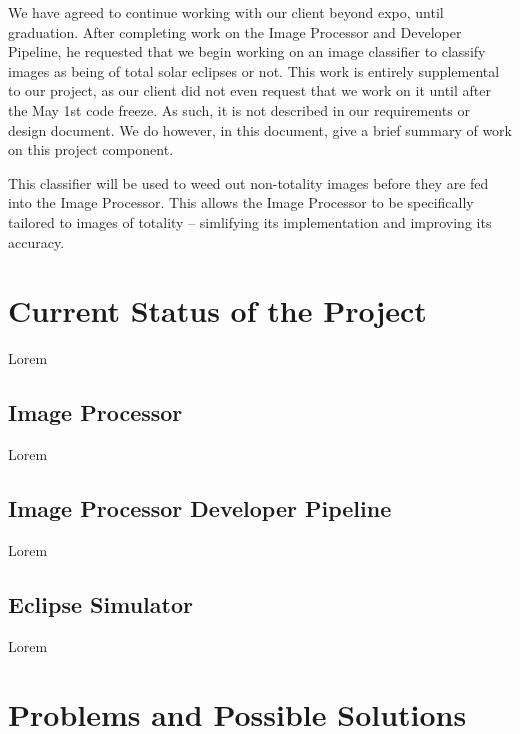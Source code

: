 \documentclass[10pt, onecolumn, draftclsnofoot, letterpaper, compsoc]{IEEEtran}
\begin{document}
We have agreed to continue working with our client beyond expo, until graduation.
After completing work on the Image Processor and Developer Pipeline, he
requested that we begin working on an image classifier to classify images as being of
total solar eclipses or not. This work is entirely supplemental to our project, as
our client did not even request that we work on it until after the May 1st code freeze.
As such, it is not described in our requirements or design document. We do however, in this
document, give a brief summary of work on this project component.

This classifier will be used to weed out non-totality images before they are fed into the
Image Processor. This allows the Image Processor to be specifically tailored to images
of totality -- simlifying its implementation and improving its accuracy. \\

\section{Current Status of the Project}

Lorem \\

\subsection{Image Processor}

Lorem \\

\subsection{Image Processor Developer Pipeline}

Lorem \\

\subsection{Eclipse Simulator}

Lorem \\


\section{Problems and Possible Solutions}
\end{document}
